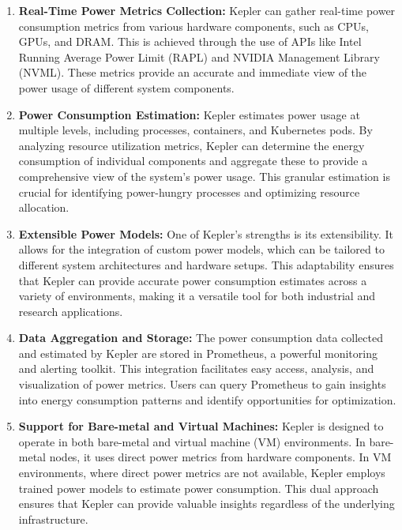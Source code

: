 \begin{enumerate}
    \item \textbf{Real-Time Power Metrics Collection:} Kepler can gather real-time power consumption metrics from various hardware components, such as CPUs, GPUs, and DRAM. This is achieved through the use of APIs like Intel Running Average Power Limit (RAPL) and NVIDIA Management Library (NVML). These metrics provide an accurate and immediate view of the power usage of different system components.

    \item \textbf{Power Consumption Estimation:} Kepler estimates power usage at multiple levels, including processes, containers, and Kubernetes pods. By analyzing resource utilization metrics, Kepler can determine the energy consumption of individual components and aggregate these to provide a comprehensive view of the system's power usage. This granular estimation is crucial for identifying power-hungry processes and optimizing resource allocation.

    \item \textbf{Extensible Power Models:} One of Kepler's strengths is its extensibility. It allows for the integration of custom power models, which can be tailored to different system architectures and hardware setups. This adaptability ensures that Kepler can provide accurate power consumption estimates across a variety of environments, making it a versatile tool for both industrial and research applications.

    \item \textbf{Data Aggregation and Storage:} The power consumption data collected and estimated by Kepler are stored in Prometheus, a powerful monitoring and alerting toolkit. This integration facilitates easy access, analysis, and visualization of power metrics. Users can query Prometheus to gain insights into energy consumption patterns and identify opportunities for optimization.

    \item \textbf{Support for Bare-metal and Virtual Machines:} Kepler is designed to operate in both bare-metal and virtual machine (VM) environments. In bare-metal nodes, it uses direct power metrics from hardware components. In VM environments, where direct power metrics are not available, Kepler employs trained power models to estimate power consumption. This dual approach ensures that Kepler can provide valuable insights regardless of the underlying infrastructure.
\end{enumerate}

